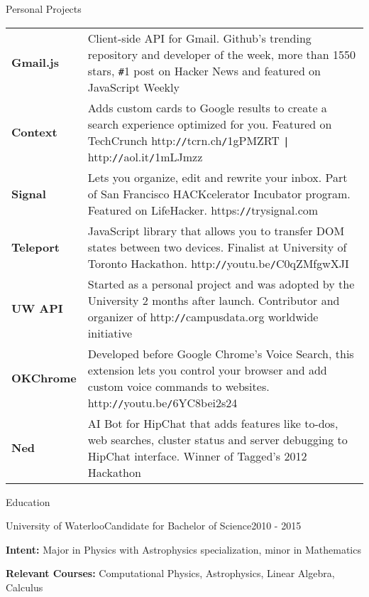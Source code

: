 \documentclass[oneside]{resume}
\begin{document}
  \begin{rSection}{Personal Projects}

    \begin{tabular}{@{} >{\bfseries}l @{\hspace{1ex}:\hspace{1ex}} p{14.5cm}}
      Gmail.js & Client-side API for Gmail. Github's trending repository and developer of the week, more than 1550 stars,
                 \texttt{\#}1 post on Hacker News and featured on JavaScript Weekly \\[0.5ex]

      Context  & Adds custom cards to Google results to create a search experience optimized for you. 
                 Featured on TechCrunch http:\texttt{//}tcrn.ch\texttt{/}1gPMZRT \texttt{|} http:\texttt{//}aol.it\texttt{/}1mLJmzz \\[0.5ex]

      Signal   & Lets you organize, edit and rewrite your inbox. Part of San Francisco HACKcelerator
                 Incubator program. Featured on LifeHacker. https:\texttt{//}trysignal.com \\[0.5ex]

      Teleport & JavaScript library that allows you to transfer DOM states between two devices.
                 Finalist at University of Toronto Hackathon. http:\texttt{//}youtu.be\texttt{/}C0qZMfgwXJI \\[0.5ex]

      UW API   & Started as a personal project and was adopted by the University 2 months after launch.
                 Contributor and organizer of http:\texttt{//}campusdata.org worldwide initiative  \\[0.5ex]

      OKChrome & Developed before Google Chrome's Voice Search, this extension lets you control your browser
                 and add custom voice commands to websites. http:\texttt{//}youtu.be\texttt{/}6YC8bei2s24 \\[0.5ex]

      Ned      & AI Bot for HipChat that adds features like to-dos, web searches, cluster status and server
                 debugging to HipChat interface. Winner of Tagged's 2012 Hackathon \\
    \end{tabular}

  \end{rSection}


  \begin{rSection}{Education}

    \begin{rEducation}{University of Waterloo}{Candidate for Bachelor of Science}{}{2010 - 2015}
      \item {\bfseries{Intent:}} Major in Physics with Astrophysics specialization, minor in Mathematics
      \item {\bfseries{Relevant Courses:}} Computational Physics, Astrophysics, Linear Algebra, Calculus
    \end{rEducation}

  \end{rSection}
\end{document}
